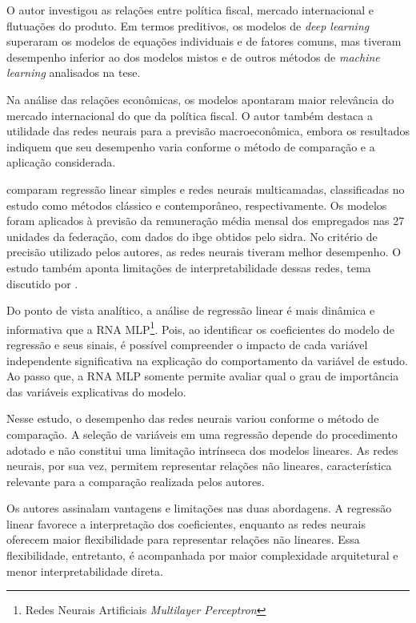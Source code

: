 O autor investigou as relações entre política fiscal, mercado internacional e flutuações do produto. Em termos preditivos, os modelos de \textit{deep learning} superaram os modelos de equações individuais e de fatores comuns, mas tiveram desempenho inferior ao dos modelos mistos e de outros métodos de \textit{machine learning} analisados na tese.

Na análise das relações econômicas, os modelos apontaram maior relevância do mercado internacional do que da política fiscal. O autor também destaca a utilidade das redes neurais para a previsão macroeconômica, embora os resultados indiquem que seu desempenho varia conforme o método de comparação e a aplicação considerada.

 comparam regressão linear simples e redes neurais multicamadas, classificadas no estudo como métodos clássico e contemporâneo, respectivamente. Os modelos foram aplicados à previsão da remuneração média mensal dos empregados nas 27 unidades da federação, com dados do \ac{ibge} obtidos pelo \ac{sidra}. No critério de precisão utilizado pelos autores, as redes neurais tiveram melhor desempenho. O estudo também aponta limitações de interpretabilidade dessas redes, tema discutido por .

\begin{citacao}
	Do ponto de vista analítico, a análise de regressão linear é mais dinâmica e informativa que a RNA MLP\footnote{Redes Neurais Artificiais \textit{Multilayer Perceptron}}. Pois, ao identificar os coeficientes do modelo de regressão e seus sinais, é possível compreender o impacto de cada variável independente significativa na explicação do comportamento da variável de estudo. Ao passo que, a RNA MLP somente permite avaliar qual o grau de importância das variáveis  explicativas do modelo. 
\end{citacao}

Nesse estudo, o desempenho das redes neurais variou conforme o método de comparação. A seleção de variáveis em uma regressão depende do procedimento adotado e não constitui uma limitação intrínseca dos modelos lineares. As redes neurais, por sua vez, permitem representar relações não lineares, característica relevante para a comparação realizada pelos autores.

Os autores assinalam vantagens e limitações nas duas abordagens. A regressão linear favorece a interpretação dos coeficientes, enquanto as redes neurais oferecem maior flexibilidade para representar relações não lineares. Essa flexibilidade, entretanto, é acompanhada por maior complexidade arquitetural e menor interpretabilidade direta.

